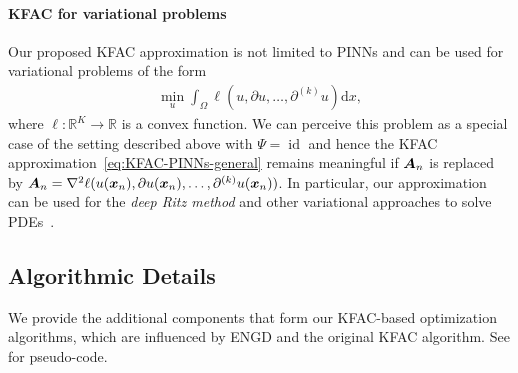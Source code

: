 \paragraph{KFAC for variational problems}
Our proposed KFAC approximation is not limited to PINNs and can be used for variational problems of the form  
\begin{align}
    \min_u \int_\Omega \ell(u, \partial u, \dots, \partial^{(k)} u) \mathrm{d}x,
\end{align}
where $\ell\colon\mathbb R^K\to\mathbb R$ is a convex function. 
We can perceive this problem as a special case of the setting described above with $\Psi = \operatorname{id}$ and hence the KFAC approximation~\eqref{eq:KFAC-PINNs-general} remains meaningful %
if ${\bm{A}}_n$ is replaced by ${\bm{A}}_n = \nabla^2\ell(u({\bm{x}}_n), \partial u({\bm{x}}_n), \dots, \partial^{(k)}u({\bm{x}}_n))$. 
In particular, our approximation can be used for the \emph{deep Ritz method} and other variational approaches to solve PDEs~\citep{yu2018deep}. 

\begin{comment}
    \subsection{Computational complexity}
\todo[inline]{what can we say? probably better to move to the respective approximations}
\begin{itemize}
    \item GN: $O(p^3+Np^2)$
    \item BFGS: $O(p^2+?)$
    \item L-BFGS: $O(mp+?)$?
    \item KFAC: $O(?)$
    \item
\end{itemize}
\end{comment}

\subsection{Algorithmic Details}

We provide the additional components that form our KFAC-based optimization algorithms, which are influenced by ENGD and the original KFAC algorithm.
See  for pseudo-code.

